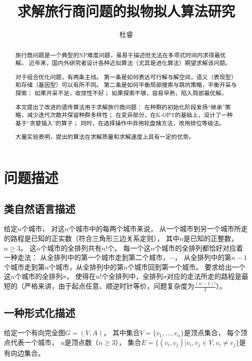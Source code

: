 \documentclass[12pt]{ctexart}
\title{求解旅行商问题的拟物拟人算法研究}
\author{杜睿}
\date{}
\begin{document}
\tableofcontents

\maketitle
\begin{abstract}
    旅行商问题是一个典型的NP难度问题，虽易于描述但无法在多项式时间内求得最优解。
    近年来，国内外研究者设计各种近似算法（尤其是进化算法）期望求解该问题。

    对于组合优化问题，有两条主线。
    第一条是如何表达可行解与解空间，语义（表现型）和存储（基因型）可以有所不同。
    第二条是如何平衡局部搜索与跳坑策略，平衡开采与探索：
    如果开采不足，收敛性不好；
    如果探索不够，容易早熟，陷入局部最优解。

    本文提出了改进的遗传算法用于求解旅行商问题：
    在种群的初始化阶段发扬“继承”策略，减少迭代次数并保留种群多样性；
    在变异部分，在K-OPT的基础上，设计了一种基于“贪婪插入”的算子；
    同时，在选择操作中弃用轮盘赌方法，改用排位等级法。

    大量实验表明，提出的算法在求解质量和求解速度上具有一定的优势。

\end{abstract}

\section{问题描述}

\subsection{类自然语言描述}
给定$n$个城市，
对这$n$个城市中的每两个城市来说，
从一个城市到另一个城市所走的路程是已知的正实数（符合三角形三边关系定则），
其中$n$是已知的正整数，$n \ge 3$。
这$n$个城市的全排列共有$n$!个。
每一个这$n$个城市的全排列都恰好对应着一种走法：
从全排列中的第一个城市走到第二个城市，$\cdots$，
从全排列中的第$n-1$个城市走到第$n$个城市，从全排列中的第$n$个城市回到第一个城市。
要求给出一个这$n$个城市的全排列$\sigma$，
使得在$n$!个全排列中，全排列$\sigma$对应的走法所走的路程是最短的（严格来讲，由于起点任意、顺逆时针等价，问题复杂度为$\frac{(n-1)!}{2}$）。

\subsection{一种形式化描述}
给定一个有向完全图$G=(V,A)$，
其中集合$V=\{v_1,\dots,v_n\}$是顶点集合，
每个顶点代表一个城市，
$n$是顶点数（$n \ge 3$），
集合$E=\{(v_i,v_j) | v_i,v_j \in V,v_i \ne v_j\}$是有向边集合。
\end{document}
